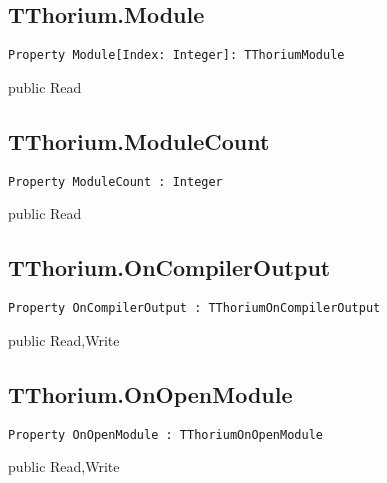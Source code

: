 \subsection{TThorium.Module}
\label{thoriumcore:thorium:tthorium:module}
\begin{FPCList}
\Synopsis
\Declaration 

\begin{verbatim}
Property Module[Index: Integer]: TThoriumModule
\end{verbatim}
\Visibility
public
\Access
Read
\Description
\end{FPCList}
\subsection{TThorium.ModuleCount}
\label{thoriumcore:thorium:tthorium:modulecount}
\begin{FPCList}
\Synopsis
\Declaration 

\begin{verbatim}
Property ModuleCount : Integer
\end{verbatim}
\Visibility
public
\Access
Read
\Description
\end{FPCList}
\subsection{TThorium.OnCompilerOutput}
\label{thoriumcore:thorium:tthorium:oncompileroutput}
\begin{FPCList}
\Synopsis
\Declaration 

\begin{verbatim}
Property OnCompilerOutput : TThoriumOnCompilerOutput
\end{verbatim}
\Visibility
public
\Access
Read,Write
\Description
\end{FPCList}
\subsection{TThorium.OnOpenModule}
\label{thoriumcore:thorium:tthorium:onopenmodule}
\begin{FPCList}
\Synopsis
\Declaration 

\begin{verbatim}
Property OnOpenModule : TThoriumOnOpenModule
\end{verbatim}
\Visibility
public
\Access
Read,Write
\Description
\end{FPCList}
